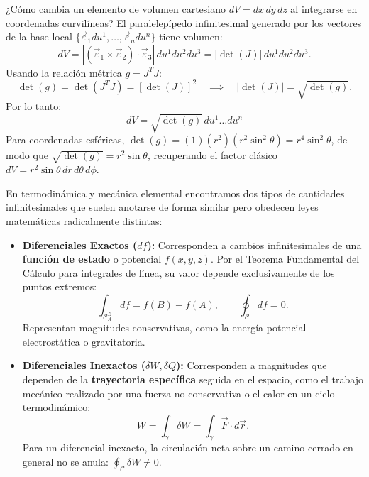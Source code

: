 \documentclass[11pt,letterpaper]{article}
\begin{document}

¿Cómo cambia un elemento de volumen cartesiano $dV = dx\,dy\,dz$ al integrarse en coordenadas curvilíneas?
El paralelepípedo infinitesimal generado por los vectores de la base local $\{\vec{\varepsilon}_1 du^1, \dots, \vec{\varepsilon}_n du^n\}$ tiene volumen:
\[
dV = |(\vec{\varepsilon}_1 \times \vec{\varepsilon}_2)\cdot\vec{\varepsilon}_3|\,du^1 du^2 du^3 = |\det(J)|\,du^1 du^2 du^3.
\]
Usando la relación métrica $g = J^T J$:
\[
\det(g) = \det(J^T J) = [\det(J)]^2 \quad \implies \quad |\det(J)| = \sqrt{\det(g)}.
\]
Por lo tanto:
\[
\boxed{dV = \sqrt{\det(g)}\,du^1 \dots du^n}
\]
Para coordenadas esféricas, $\det(g) = (1)(r^2)(r^2\sin^2\theta) = r^4\sin^2\theta$, de modo que $\sqrt{\det(g)} = r^2\sin\theta$, recuperando el factor clásico $dV = r^2\sin\theta\,dr\,d\theta\,d\phi$.


En termodinámica y mecánica elemental encontramos dos tipos de cantidades infinitesimales que suelen anotarse de forma similar pero obedecen leyes matemáticas radicalmente distintas:
\begin{itemize}
    \item \textbf{Diferenciales Exactos ($df$):} Corresponden a cambios infinitesimales de una \textbf{función de estado} o potencial $f(x, y, z)$. Por el Teorema Fundamental del Cálculo para integrales de línea, su valor depende exclusivamente de los puntos extremos:
    \[
    \int_{\mathcal{C}_A^B} df = f(B) - f(A), \qquad \oint_\mathcal{C} df = 0.
    \]
    Representan magnitudes conservativas, como la energía potencial electrostática o gravitatoria.
    \item \textbf{Diferenciales Inexactos ($\delta W, \delta Q$):} Corresponden a magnitudes que dependen de la \textbf{trayectoria específica} seguida en el espacio, como el trabajo mecánico realizado por una fuerza no conservativa o el calor en un ciclo termodinámico:
    \[
    W = \int_\gamma \delta W = \int_\gamma \vec{F}\cdot d\vec{r}.
    \]
    Para un diferencial inexacto, la circulación neta sobre un camino cerrado en general no se anula: $\oint_\mathcal{C} \delta W \neq 0$.
\end{itemize}
\end{document}
